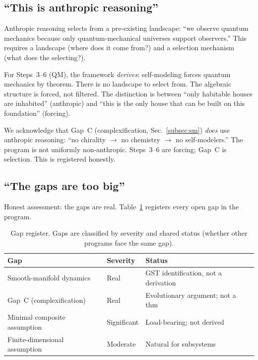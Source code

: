 \subsection{``This is anthropic reasoning''}
\label{subsec:obj-anthropic}

Anthropic reasoning selects from a pre-existing landscape: ``we
observe quantum mechanics because only quantum-mechanical universes
support observers.''  This requires a landscape (where does it come
from?) and a selection mechanism (what does the selecting?).

For Steps~3--6 (QM), the framework \emph{derives}: self-modeling
forces quantum mechanics by theorem.  There is no landscape to select
from.  The algebraic structure is forced, not filtered.  The
distinction is between ``only habitable houses are inhabited''
(anthropic) and ``this is the only house that can be built on this
foundation'' (forcing).

We acknowledge that Gap~C (complexification, Sec.~\ref{subsec:sm})
\emph{does} use anthropic reasoning: ``no chirality $\to$ no chemistry
$\to$ no self-modelers.''  The program is not uniformly non-anthropic.
Steps~3--6 are forcing; Gap~C is selection.  This is registered
honestly.

\subsection{``The gaps are too big''}
\label{subsec:obj-gaps}

Honest assessment: the gaps are real.  Table~\ref{tab:gaps} registers
every open gap in the program.

\begin{table}[ht]
\centering
\caption{Gap register.  Gaps are classified by severity and shared
  status (whether other programs face the same gap).}
\label{tab:gaps}
\begin{tabular}{@{}p{3.6cm}p{1.2cm}p{2.7cm}@{}}
\toprule
Gap & Severity & Status \\
\midrule
Smooth-manifold dynamics & Real & GST identification, not a derivation \\
Gap~C (complexification) & Real & Evolutionary argument; not a thm \\
Minimal composite assumption & Significant & Load-bearing; not derived \\
Finite-dimensional assumption & Moderate & Natural for subsystems \\
\bottomrule
\end{tabular}
\end{table}

